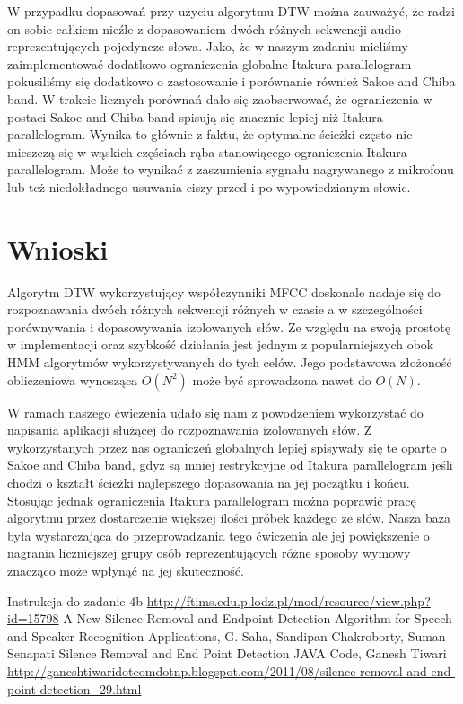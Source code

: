 \documentclass{classrep}
\begin{document}
W przypadku dopasowań przy użyciu algorytmu DTW można zauważyć, że radzi on sobie całkiem nieźle z dopasowaniem dwóch różnych sekwencji audio reprezentujących pojedyncze słowa. Jako, że w naszym zadaniu mieliśmy zaimplementować dodatkowo ograniczenia globalne Itakura parallelogram pokusiliśmy się dodatkowo o zastosowanie i porównanie również Sakoe and Chiba band. W trakcie licznych porównań dało się zaobserwować, że ograniczenia w postaci Sakoe and Chiba band spisują się znacznie lepiej niż Itakura parallelogram. Wynika to głównie z faktu, że optymalne ścieżki często nie mieszczą się w wąskich częściach rąba stanowiącego ograniczenia Itakura parallelogram. Może to wynikać z zaszumienia sygnału nagrywanego z mikrofonu lub też niedokładnego usuwania ciszy przed i po wypowiedzianym słowie. 

\section{Wnioski}

Algorytm DTW wykorzystujący współczynniki MFCC doskonale nadaje się do rozpoznawania dwóch różnych sekwencji różnych w czasie a w szczególności porównywania i dopasowywania izolowanych słów. Ze względu na swoją prostotę w implementacji oraz szybkość działania jest jednym z popularniejszych obok HMM algorytmów wykorzystywanych do tych celów. Jego podstawowa złożoność obliczeniowa wynosząca $O(N^2)$ może być sprowadzona nawet do $O(N)$. 

W ramach naszego ćwiczenia udało się nam z powodzeniem wykorzystać do napisania aplikacji służącej do rozpoznawania izolowanych słów. Z wykorzystanych przez nas ograniczeń globalnych lepiej spisywały się te oparte o Sakoe and Chiba band, gdyż są mniej restrykcyjne od Itakura parallelogram jeśli chodzi o kształt ścieżki najlepszego dopasowania na jej początku i końcu. Stosując jednak ograniczenia Itakura parallelogram można poprawić pracę algorytmu przez dostarczenie większej ilości próbek każdego ze słów. Nasza baza była wystarczająca do przeprowadzania tego ćwiczenia ale jej powiększenie o nagrania liczniejszej grupy osób reprezentujących różne sposoby wymowy znacząco może wpłynąć na jej skuteczność.

\begin{thebibliography}{1}
 Instrukcja do zadanie 4b \url{http://ftims.edu.p.lodz.pl/mod/resource/view.php?id=15798}
 A New Silence Removal and Endpoint Detection Algorithm for Speech and Speaker Recognition Applications, G. Saha, Sandipan Chakroborty, Suman Senapati
 Silence Removal and End Point Detection JAVA Code, Ganesh Tiwari \url{http://ganeshtiwaridotcomdotnp.blogspot.com/2011/08/silence-removal-and-end-point-detection_29.html}
\end{thebibliography}
\end{document}
